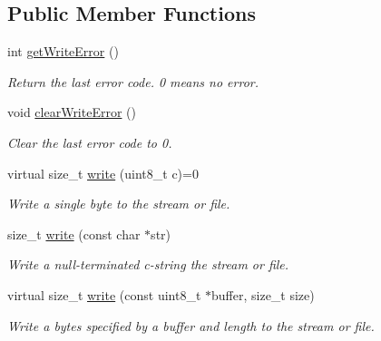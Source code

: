 \subsection*{Public Member Functions}
\begin{DoxyCompactItemize}
\item 
\mbox{\label{class_print_a88a4a829fb5d589efb43955ad0cbddcc}} 
int \mbox{\hyperlink{class_print_a88a4a829fb5d589efb43955ad0cbddcc}{get\+Write\+Error}} ()
\begin{DoxyCompactList}\small\item\em Return the last error code. 0 means no error. \end{DoxyCompactList}\item 
\mbox{\label{class_print_aec9ecf84cc6d9087a650def3cefc459e}} 
void \mbox{\hyperlink{class_print_aec9ecf84cc6d9087a650def3cefc459e}{clear\+Write\+Error}} ()
\begin{DoxyCompactList}\small\item\em Clear the last error code to 0. \end{DoxyCompactList}\item 
virtual size\+\_\+t \mbox{\hyperlink{class_print_ab9195b97274029f693aaddce6c7a0021}{write}} (uint8\+\_\+t c)=0
\begin{DoxyCompactList}\small\item\em Write a single byte to the stream or file. \end{DoxyCompactList}\item 
size\+\_\+t \mbox{\hyperlink{class_print_a5b40e0e9cab1f2fe5bb0cb22ffe5adda}{write}} (const char $\ast$str)
\begin{DoxyCompactList}\small\item\em Write a null-\/terminated c-\/string the stream or file. \end{DoxyCompactList}\item 
virtual size\+\_\+t \mbox{\hyperlink{class_print_a88864e109589a5be9b0f5ba1327f8421}{write}} (const uint8\+\_\+t $\ast$buffer, size\+\_\+t size)
\begin{DoxyCompactList}\small\item\em Write a bytes specified by a buffer and length to the stream or file. \end{DoxyCompactList}\item 
\mbox{\label{class_print_acfe80773011eb17dfb52c2fba517a093}} 

\end{DoxyCompactItemize}
